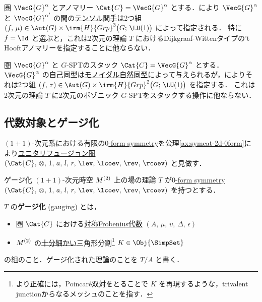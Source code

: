 \documentclass[TQFT_main]{subfiles}
\begin{document}
\begin{myexample}[label=ex:CGa]{圏 $\VecG{G}^\alpha$ とアノマリー}
    $\Cat{C} = \VecG{G}^\alpha$ とする．により
    $\VecG{G}^\alpha$ と $\VecG{G}^{\alpha'}$ の間の\hyperref[def:tensor-functor]{テンソル関手}は2つ組 $(f,\, \mu) \in \Aut (G) \times \irm{H}{Grp}^3 \bigl( G;\, \LU(1) \bigr)$ によって指定される．
    特に $f = \Id$ と選ぶと，これは2次元の理論 $T$ におけるDijkgraaf-Wittenタイプの't Hooftアノマリーを指定することに他ならない．
\end{myexample}

\begin{myexample}[label=ex:CGa]{圏 $\VecG{G}^\alpha$ と $G$-SPTのスタック}
    $\Cat{C} = \VecG{G}^\alpha$ とする．
    $\VecG{G}^\alpha$ の自己同型は\hyperref[def:tensor-functor]{モノイダル自然同型}によって与えられるが，によりそれは2つ組 $(f,\, \tau) \in \Aut (G) \times \irm{H}{Grp}^2 \bigl( G;\, \LU(1) \bigr)$ を指定する．
    これは2次元の理論 $T$ に2次元のボゾニック $G$-SPTをスタックする操作に他ならない．
\end{myexample}

\subsection{代数対象とゲージ化}

$(1+1)$-次元系における有限の\hyperref[def:p-form-sym]{$0$-form symmetry}を公理\ref{ax:symcat-2d-0form}により\hyperref[def:tensorfusion-cat]{ユニタリフュージョン圏} $(\Cat{C},\, \otimes,\, 1,\, a,\, l,\, r,\, \lev,\, \lcoev,\, \rev,\, \rcoev)$ と見做す．

\begin{mydef}[label=def:gauging]{ゲージ化}
    $(1+1)$-次元時空 $M^{(2)}$ 上の場の理論 $T$ が\hyperref[def:p-form-sym]{$0$-form symmetry} $(\Cat{C},\, \otimes,\, 1,\, a,\, l,\, r,\, \lev,\, \lcoev,\, \rev,\, \rcoev)$ を持つとする．

    $T$ の\textbf{ゲージ化} (gauging) とは，
    \begin{itemize}
        \item 圏 $\Cat{C}$ における\hyperref[def:sym-Frobenius]{対称Frobenius代数} $(A,\, \mu,\, \upsilon,\, \Delta,\, \epsilon)$
        \item $M^{(2)}$ の\underline{十分細かい}三角形分割\footnote{より正確には，Poincar\'{e}双対をとることで $K$ を再現するような，trivalent junctionからなるメッシュのことを指す．} $K \in \Obj{\SimpSet}$
    \end{itemize}
    の組のこと．ゲージ化された理論のことを $T/A$ と書く．
\end{mydef}
\end{document}
